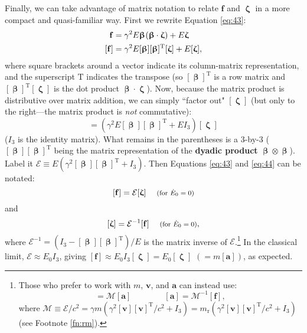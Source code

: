 \documentclass[12pt]{article}
\renewcommand{\vv}[1]{\mathbf{#1}}
\newcommand{\vvbeta}{\bm{\upbeta}}
\newcommand{\vvzeta}{\bm{\upzeta}}
\begin{document}
Finally, we can take advantage of matrix notation to relate $\vv f$ and $\vvzeta$ in a more compact and quasi-familiar way. First we rewrite Equation \ref{eq:43}:
\begin{equation*}
\begin{split}
\vv f &= \gamma^2 E \vvbeta \mkern1mu (\vvbeta \cdot \vvzeta) + E \vvzeta \\
[\vv f] &= \gamma^2 E [\vvbeta] [\vvbeta]^{\mathrm{T}} [\vvzeta] + E [\vvzeta] ,
\end{split}
\end{equation*}
where square brackets around a vector indicate its column-matrix representation, and the superscript $\mathrm{T}$ indicates the transpose (so $[\vvbeta]^{\mathrm{T}}$ is a row matrix and $[\vvbeta]^{\mathrm{T}} [\vvzeta]$ is the dot product $\vvbeta \cdot \vvzeta$). Now, because the matrix product is distributive over matrix addition, we can simply ``factor out" $[\vvzeta]$ (but only to the right---the matrix product is \emph{not} commutative):
\begin{equation*}
[\vv f] = (\gamma^2 E [\vvbeta] [\vvbeta]^{\mathrm{T}} + E I_3) [\vvzeta]
\end{equation*}
($I_3$ is the identity matrix). What remains in the parentheses is a 3-by-3 ($[\vvbeta] [\vvbeta]^{\mathrm{T}}$ being the matrix representation of the \textbf{dyadic product} $\vvbeta \otimes \vvbeta$). Label it $\mathcal{E} \equiv E(\gamma^2 [\vvbeta] [\vvbeta]^{\mathrm{T}} + I_3)$. Then Equations \ref{eq:43} and \ref{eq:44} can be notated:
\begin{equation}\label{eq:48}
[\vv f] = \mathcal{E} [\vvzeta] \quad \textrm{\footnotesize{ (for $\dot{E}_0 = 0$)}}
\end{equation}
and
\begin{equation}\label{eq:49}
[\vvzeta] = \mathcal{E}^{-1} [\vv f] \quad \textrm{\footnotesize{ (for $\dot{E}_0 = 0$)}},
\end{equation}
where $\mathcal{E}^{-1} = (I_3 - [\vvbeta] [\vvbeta]^{\mathrm{T}})/E$ is the matrix inverse of $\mathcal{E}$.\footnote{Those who prefer to work with $m$, $\vv v$, and $\vv a$ can instead use:
\begin{equation*}
[\vv f] = \mathcal{M} [\vv a] \qquad \qquad [\vv a] = \mathcal{M}^{-1} [\vv f],
\end{equation*}
where $\mathcal{M} \equiv \mathcal{E} / c^2 = \gamma m (\gamma^2 [\vv v] [\vv v]^{\mathrm{T}}/c^2 + I_3) =  m_{\textrm{r}}(\gamma^2 [\vv v] [\vv v]^{\mathrm{T}}/c^2 + I_3)$ (see Footnote \ref{fn:rm}).} In the classical limit, $\mathcal{E} \approx E_0 I_3$, giving $[\vv f] \approx E_0 I_3 [\vvzeta] = E_0 [\vvzeta]$ $(= m [\vv a])$, as expected.
\end{document}
